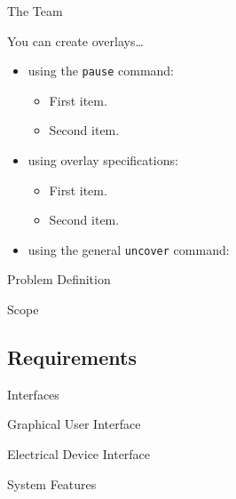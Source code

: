 \documentclass{beamer}
\begin{document}
\begin{frame}{The Team}

  You can create overlays\dots
  \begin{itemize}
  \item using the \texttt{pause} command:
    \begin{itemize}
    \item
      First item.
      \pause
    \item    
      Second item.
    \end{itemize}
  \item
    using overlay specifications:
    \begin{itemize}
    \item<3->
      First item.
    \item<4->
      Second item.
    \end{itemize}
  \item
    using the general \texttt{uncover} command:
    \begin{itemize}
    \end{itemize}
  \end{itemize}
\end{frame}

\begin{frame}{Problem Definition}
\end{frame}

\begin{frame}{Scope}
\end{frame}


\subsection{Requirements}

\begin{frame}{Interfaces}
\end{frame}

\begin{frame}{Graphical User Interface}
\end{frame}


\begin{frame}{Electrical Device Interface}
\end{frame}

\begin{frame}{System Features}
\end{frame}
\end{document}
